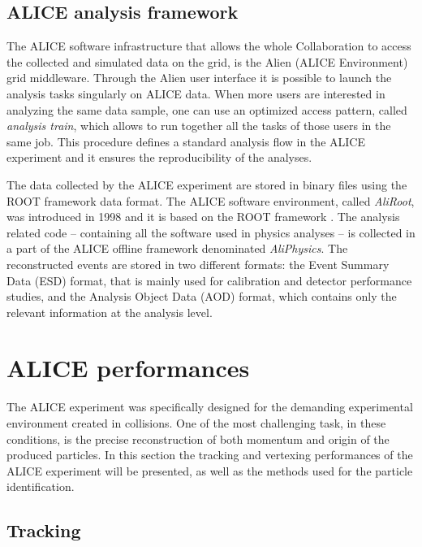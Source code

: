 %
\subsection{ALICE analysis framework} \label{sec:anal_frame}

The ALICE software infrastructure that allows  the whole Collaboration to access the collected and simulated data on the grid, is the Alien (ALICE Environment) \cite{alien} grid middleware.
Through the Alien user interface it is possible to launch the analysis tasks singularly on ALICE data. 
When more users are interested in analyzing the same data sample, one can use an optimized
access pattern, called \textit{analysis train}, which allows to run together all the tasks
of those users in the same job.
This procedure defines a standard analysis flow in the ALICE experiment and it ensures the reproducibility of the
analyses.

The data collected by the ALICE experiment are stored in binary files using the ROOT framework data 
format.
The ALICE software environment, called \textit{AliRoot}, was introduced in 1998 and it is based on the ROOT framework
\cite{root}.
The analysis related code -- containing all the software used in physics analyses -- is collected
in a part of the ALICE offline framework denominated \textit{AliPhysics}.
The reconstructed events are stored in two different formats: the Event Summary Data (ESD) format, 
that is mainly used for calibration and detector performance studies, and the Analysis Object Data 
(AOD) format, which contains only the relevant information at the analysis level.

%
%
\section{ALICE performances} \label{sec:ali_perf}

The ALICE experiment was specifically designed for the demanding experimental environment created in 
\PbPb collisions. 
One of the most challenging task, in these conditions, is the precise reconstruction of both momentum
and origin of the produced particles.
In this section the tracking and vertexing performances of the ALICE experiment will be presented,
as well as the methods used for the particle identification.

%
\subsection{Tracking} \label{sec:tarcking}

